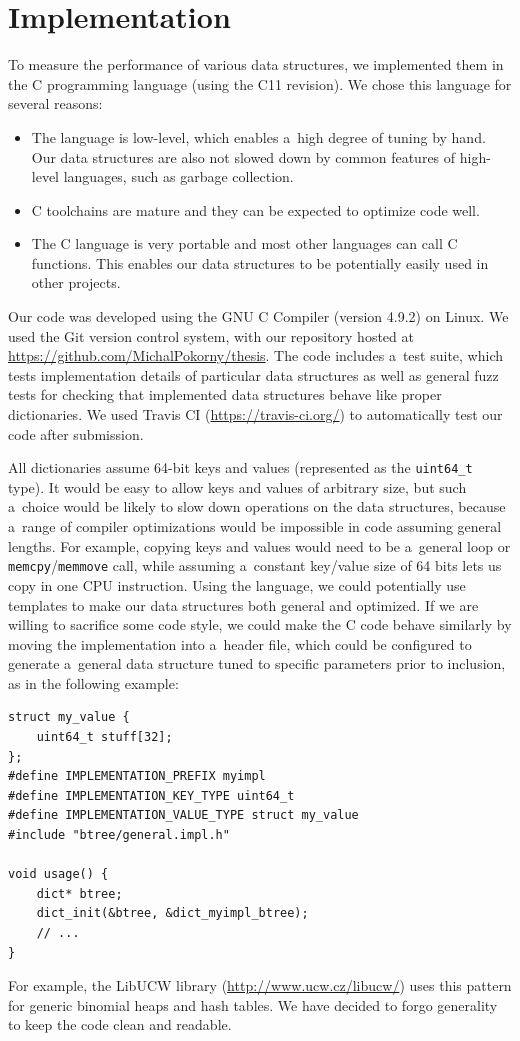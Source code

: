 \chapter{Implementation}
\label{chapter:implementation}
To measure the performance of various data structures, we implemented them
in the C programming language (using the C11 revision).
We chose this language for several reasons:
\begin{itemize}
\item The language is low-level, which enables a~high degree of tuning by hand.
	Our data structures are also not slowed down by common features of
	high-level languages, such as garbage collection.
\item C toolchains are mature and they can be expected to optimize code well.
\item The C language is very portable and most other languages can
	call C functions. This enables our data structures to be potentially
	easily used in other projects.
\end{itemize}

Our code was developed using the GNU C Compiler (version 4.9.2) on Linux.
We used the Git version control system, with our repository hosted at
\url{https://github.com/MichalPokorny/thesis}. The code includes a~test suite,
which tests implementation details of particular data structures as well
as general fuzz tests for checking that implemented data structures behave
like proper dictionaries. We used Travis CI (\url{https://travis-ci.org/})
to automatically test our code after submission.

All dictionaries assume 64-bit keys and values (represented as the
\texttt{uint64\_t} type). It would be easy to allow keys and values of arbitrary
size, but such a~choice would be likely to slow down operations on
the data structures, because a~range of compiler optimizations would
be impossible in code assuming general lengths. For example, copying
keys and values would need to be a~general loop or
\texttt{memcpy}/\texttt{memmove} call, while assuming a~constant key/value
size of 64 bits lets us copy in one CPU instruction. Using the \Cpp{} language,
we could potentially use templates to make our data structures both general
and optimized. If we are willing to sacrifice some code style, we could
make the C code behave similarly by moving the implementation into a~header
file, which could be configured to generate a~general data structure
tuned to specific parameters prior to inclusion, as in the following example:
\begin{lstlisting}
struct my_value {
	uint64_t stuff[32];
};
#define IMPLEMENTATION_PREFIX myimpl
#define IMPLEMENTATION_KEY_TYPE uint64_t
#define IMPLEMENTATION_VALUE_TYPE struct my_value
#include "btree/general.impl.h"

void usage() {
	dict* btree;
	dict_init(&btree, &dict_myimpl_btree);
	// ...
}
\end{lstlisting}
For example, the LibUCW library (\url{http://www.ucw.cz/libucw/})
uses this pattern for generic binomial heaps and hash tables.
We have decided to forgo generality to keep the code clean and readable.

